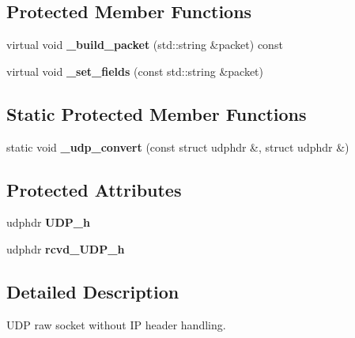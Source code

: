 \subsection*{Protected Member Functions}
\begin{CompactItemize}
\item 
\hypertarget{classsocketpp_1_1UDP__RawSocket_9f087a8fe3d6e62397911657c6b10d29}{
virtual void \textbf{\_\-build\_\-packet} (std::string \&packet) const }
\label{classsocketpp_1_1UDP__RawSocket_9f087a8fe3d6e62397911657c6b10d29}

\item 
\hypertarget{classsocketpp_1_1UDP__RawSocket_a2dd7ab190a6730f9272eced4e648b50}{
virtual void \textbf{\_\-set\_\-fields} (const std::string \&packet)}
\label{classsocketpp_1_1UDP__RawSocket_a2dd7ab190a6730f9272eced4e648b50}

\end{CompactItemize}
\subsection*{Static Protected Member Functions}
\begin{CompactItemize}
\item 
\hypertarget{classsocketpp_1_1UDP__RawSocket_400dfa2f567ecd89df1f14f08bbb44ac}{
static void \textbf{\_\-udp\_\-convert} (const struct udphdr \&, struct udphdr \&)}
\label{classsocketpp_1_1UDP__RawSocket_400dfa2f567ecd89df1f14f08bbb44ac}

\end{CompactItemize}
\subsection*{Protected Attributes}
\begin{CompactItemize}
\item 
\hypertarget{classsocketpp_1_1UDP__RawSocket_fbdcc519279aec772f575237ca25f783}{
udphdr \textbf{UDP\_\-h}}
\label{classsocketpp_1_1UDP__RawSocket_fbdcc519279aec772f575237ca25f783}

\item 
\hypertarget{classsocketpp_1_1UDP__RawSocket_9b21e1b520434f7b07d5afcc35ceb76c}{
udphdr \textbf{rcvd\_\-UDP\_\-h}}
\label{classsocketpp_1_1UDP__RawSocket_9b21e1b520434f7b07d5afcc35ceb76c}

\end{CompactItemize}


\subsection{Detailed Description}
UDP raw socket without IP header handling. 

